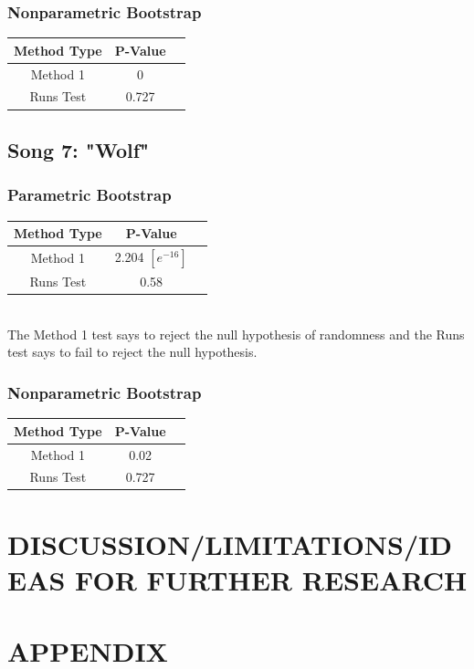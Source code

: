 \documentclass[12pt, letterpaper]{article}
\begin{document}
\subsubsection{Nonparametric Bootstrap}
\begin{tabular}{|c|c|c|}
\hline
\textbf{Method Type} & P-Value \\
\hline
Method 1 & 0  \\
\hline
Runs Test & 0.727 \\ 
\hline
\end{tabular}

\subsection{Song 7: "Wolf"}
\subsubsection{Parametric Bootstrap}
\begin{tabular}{|c|c|c|}
\hline
\textbf{Method Type} & P-Value  \\
\hline
Method 1 & 2.204 $[e^{-16}]$ \\
\hline
Runs Test & 0.58 \\ 
\hline
\end{tabular} \\
The Method 1 test says to reject the null hypothesis of randomness and the Runs test says to fail to reject the null hypothesis.

\subsubsection{Nonparametric Bootstrap}
\begin{tabular}{|c|c|c|}
\hline
\textbf{Method Type} & P-Value \\
\hline
Method 1 & 0.02  \\
\hline
Runs Test & 0.727 \\ 
\hline
\end{tabular}


\section{DISCUSSION/LIMITATIONS/IDEAS FOR FURTHER RESEARCH}

\section{APPENDIX}
\end{document}
